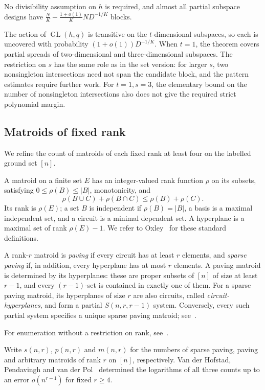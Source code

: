 \documentclass[11pt,reqno]{amsart}
\numberwithin{equation}{section}
\theoremstyle{plain}
\theoremstyle{definition}
\begin{document}
No divisibility assumption on $h$ is required, and almost all partial subspace designs have $\frac NK-\frac{1+o(1)}KND^{-1/K}$ blocks.

The action of $\operatorname{GL}(h,q)$ is transitive on the $t$-dimensional subspaces, so each is uncovered with probability $(1+o(1))D^{-1/K}$.
When $t=1$, the theorem covers partial spreads of two-dimensional and three-dimensional subspaces.
The restriction on $s$ has the same role as in the set version: for larger $s$, two nonsingleton intersections need not span the candidate block, and the pattern estimates require further work.
For $t=1,s=3$, the elementary bound on the number of nonsingleton intersections also does not give the required strict polynomial margin.


\subsection{Matroids of fixed rank}\label{subsec:matroids}

We refine the count of matroids of each fixed rank at least four on the labelled ground set $[n]$.

A matroid on a finite set $E$ has an integer-valued rank function $\rho$ on its subsets, satisfying $0\le\rho(B)\le|B|$, monotonicity, and
\[
    \rho(B\cup C)+\rho(B\cap C)\le\rho(B)+\rho(C).
\]
Its rank is $\rho(E)$; a set $B$ is independent if $\rho(B)=|B|$, a basis is a maximal independent set, and a circuit is a minimal dependent set.
A hyperplane is a maximal set of rank $\rho(E)-1$.
We refer to Oxley~\cite{Oxley} for these standard definitions.

A rank-$r$ matroid is \emph{paving} if every circuit has at least $r$ elements, and \emph{sparse paving} if, in addition, every hyperplane has at most $r$ elements.
A paving matroid is determined by its hyperplanes: these are proper subsets of $[n]$ of size at least $r-1$, and every $(r-1)$-set is contained in exactly one of them.
For a sparse paving matroid, its hyperplanes of size $r$ are also circuits, called \emph{circuit-hyperplanes}, and form a partial $S(n,r,r-1)$ system.
Conversely, every such partial system specifies a unique sparse paving matroid; see~\cite{HPP,PvdP}.

For enumeration without a restriction on rank, see~\cite{Knuth,BPvdP,MNWW,PvdPComparison}.

Write $s(n,r)$, $p(n,r)$ and $m(n,r)$ for the numbers of sparse paving, paving and arbitrary matroids of rank $r$ on $[n]$, respectively.
Van der Hofstad, Pendavingh and van der Pol~\cite[Theorems~1.4, 1.5 and~1.7]{HPP} determined the logarithms of all three counts up to an error $o(n^{r-1})$ for fixed $r\ge4$.
\end{document}
